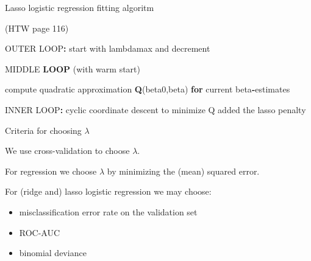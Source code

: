 \documentclass[
  ignorenonframetext,
]{beamer}
\newenvironment{Shaded}{\begin{snugshade}}{\end{snugshade}}
\newcommand{\ControlFlowTok}[1]{\textcolor[rgb]{0.13,0.29,0.53}{\textbf{#1}}}
\newcommand{\KeywordTok}[1]{\textcolor[rgb]{0.13,0.29,0.53}{\textbf{#1}}}
\newcommand{\NormalTok}[1]{#1}
\newcommand{\OperatorTok}[1]{\textcolor[rgb]{0.81,0.36,0.00}{\textbf{#1}}}
\newcommand{\StringTok}[1]{\textcolor[rgb]{0.31,0.60,0.02}{#1}}
\providecommand{\tightlist}{%
  \setlength{\itemsep}{0pt}\setlength{\parskip}{0pt}}
\begin{document}
\begin{frame}[fragile]

\begin{block}{Lasso logistic regression fitting algoritm}

(HTW page 116)

\begin{Shaded}
\begin{Highlighting}[]
\NormalTok{OUTER LOOP}\OperatorTok{:}\StringTok{ }\NormalTok{start with lambdamax and decrement}

\NormalTok{      MIDDLE }\KeywordTok{LOOP}\NormalTok{ (with warm start) }
         
\NormalTok{         compute quadratic approximation }\KeywordTok{Q}\NormalTok{(beta0,beta) }
         \ControlFlowTok{for}\NormalTok{ current beta}\OperatorTok{-}\NormalTok{estimates}
         
         
         
\NormalTok{              INNER LOOP}\OperatorTok{:}\StringTok{ }\NormalTok{cyclic coordinate descent}
\NormalTok{              to minimize Q added the lasso penalty}
\end{Highlighting}
\end{Shaded}

\end{block}

\end{frame}

\begin{frame}

\begin{block}{Criteria for choosing \(\lambda\)}

We use cross-validation to choose \(\lambda\).

For regression we choose \(\lambda\) by minimizing the (mean) squared
error.

For (ridge and) lasso logistic regression we may choose:

\begin{itemize}
\tightlist
\item
  misclassification error rate on the validation set
\item
  ROC-AUC
\item
  binomial deviance
\end{itemize}

\end{block}

\end{frame}
\end{document}
